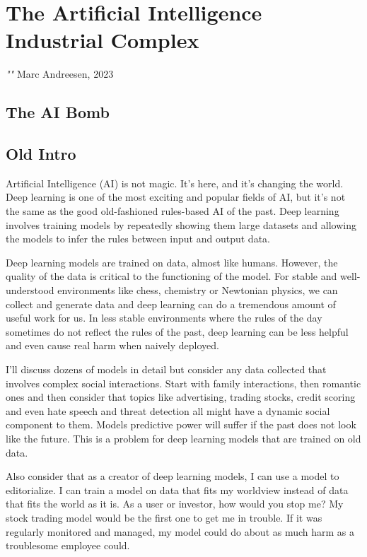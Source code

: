 \setchapterpreamble[u]{\margintoc}
\chapter{The Artificial Intelligence Industrial Complex}

\textit{""} Marc Andreesen, 2023 \cite{welsh2023}

\section{The AI Bomb}





\section{Old Intro}

Artificial Intelligence (AI) is not magic. It's here, and it's changing the world. Deep learning is one of the most exciting and popular fields of AI, but it's not the same as the good old-fashioned rules-based AI of the past. Deep learning involves training models by repeatedly showing them large datasets and allowing the models to infer the rules between input and output data.

Deep learning models are trained on data, almost like humans. However, the quality of the data is critical to the functioning of the model. For stable and well-understood environments like chess, chemistry or Newtonian physics, we can collect and generate data and deep learning can do a tremendous amount of useful work for us. In less stable environments where the rules of the day sometimes do not reflect the rules of the past, deep learning can be less helpful and even cause real harm when naively deployed. 

I'll discuss dozens of models in detail but consider any data collected that involves complex social interactions. Start with family interactions, then romantic ones and then consider that topics like advertising, trading stocks, credit scoring and even hate speech and threat detection all might have a dynamic social component to them. Models predictive power will suffer if the past does not look like the future. This is a problem for deep learning models that are trained on old data.

Also consider that as a creator of deep learning models, I can use a model to editorialize. I can train a model on data that fits my worldview instead of data that fits the world as it is. As a user or investor, how would you stop me? My stock trading model would be the first one to get me in trouble. If it was regularly monitored and managed, my model could do about as much harm as a troublesome employee could. 


